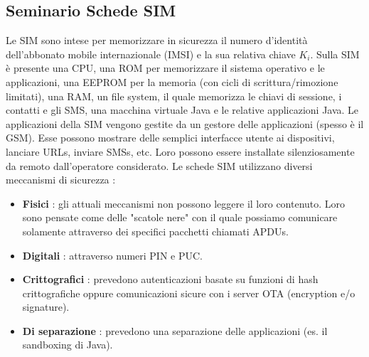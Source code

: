 \documentclass[12pt]{report}
\begin{document}
\begin{appendix}
\chapter{Seminario Schede SIM}
Le SIM sono intese per memorizzare in sicurezza il numero d'identità dell'abbonato mobile internazionale (IMSI) e la sua relativa chiave $K_i$. Sulla SIM è presente una CPU, una ROM per memorizzare il sistema operativo e le applicazioni, una EEPROM per la memoria (con cicli di scrittura/rimozione limitati), una RAM, un file system, il quale memorizza le chiavi di sessione, i contatti e gli SMS, una macchina virtuale Java e le relative applicazioni Java. Le applicazioni della SIM vengono gestite da un gestore delle applicazioni (spesso è il GSM). Esse possono mostrare delle semplici interfacce utente ai dispositivi, lanciare URLs, inviare SMSs, etc. Loro possono essere installate silenziosamente da remoto dall'operatore considerato. Le schede SIM utilizzano diversi meccanismi di sicurezza :
\begin{itemize}
\item \textbf{Fisici} : gli attuali meccanismi non possono leggere il loro contenuto. Loro sono pensate come delle "scatole nere" con il quale possiamo comunicare solamente attraverso dei specifici pacchetti chiamati APDUs.
\item \textbf{Digitali} : attraverso numeri PIN e PUC.
\item \textbf{Crittografici} : prevedono autenticazioni basate su funzioni di hash crittografiche oppure comunicazioni sicure con i server OTA (encryption e/o signature).
\item \textbf{Di separazione} : prevedono una separazione delle applicazioni (es. il sandboxing di Java).
\end{itemize}

\end{appendix}
\end{document}
